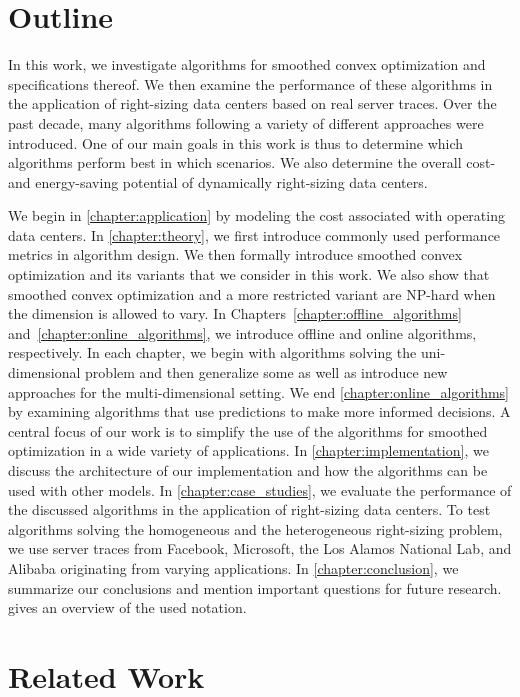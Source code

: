 \section{Outline}

In this work, we investigate algorithms for smoothed convex optimization and specifications thereof. We then examine the performance of these algorithms in the application of right-sizing data centers based on real server traces. Over the past decade, many algorithms following a variety of different approaches were introduced. One of our main goals in this work is thus to determine which algorithms perform best in which scenarios. We also determine the overall cost- and energy-saving potential of dynamically right-sizing data centers.

We begin in \cref{chapter:application} by modeling the cost associated with operating data centers. In \cref{chapter:theory}, we first introduce commonly used performance metrics in algorithm design. We then formally introduce smoothed convex optimization and its variants that we consider in this work. We also show that smoothed convex optimization and a more restricted variant are NP-hard when the dimension is allowed to vary. In Chapters~\ref{chapter:offline_algorithms} and~\ref{chapter:online_algorithms}, we introduce offline and online algorithms, respectively. In each chapter, we begin with algorithms solving the uni-dimensional problem and then generalize some as well as introduce new approaches for the multi-dimensional setting. We end \cref{chapter:online_algorithms} by examining algorithms that use predictions to make more informed decisions. A central focus of our work is to simplify the use of the algorithms for smoothed optimization in a wide variety of applications. In \cref{chapter:implementation}, we discuss the architecture of our implementation and how the algorithms can be used with other models. In \cref{chapter:case_studies}, we evaluate the performance of the discussed algorithms in the application of right-sizing data centers. To test algorithms solving the homogeneous and the heterogeneous right-sizing problem, we use server traces from Facebook, Microsoft, the Los Alamos National Lab, and Alibaba originating from varying applications. In \cref{chapter:conclusion}, we summarize our conclusions and mention important questions for future research.  gives an overview of the used notation.

\section{Related Work}\label{section:introduction:related_work}

